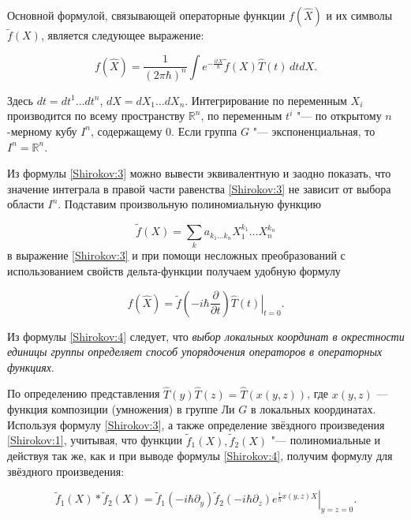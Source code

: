 Основной формулой, связывающей операторные функции $f(\hat X)$ и их символы ${\tilde f}(X)$, является следующее выражение:

\begin{equation}\label{Shirokov:3}

f(\hat X)=\frac{1}{(2\pi\hbar)^n}\int e^{-\frac{itX}{\hbar}}{\tilde f}(X)\hat T(t)\,dt dX.

\end{equation}

Здесь $dt=dt^1\dots dt^n$, $dX=dX_1\dots dX_n$. Интегрирование по переменным $X_i$ производится по всему пространству $\mathbb R^n$, по переменным $t^i$ "--- по открытому $n$-мерному кубу $I^n$, содержащему 0. Если группа $G$ "--- экспоненциальная, то $I^n=\mathbb R^n$.





Из формулы \eqref{Shirokov:3} можно вывести эквивалентную и заодно показать, что значение интеграла в правой части равенства  \eqref{Shirokov:3} не зависит от выбора области $I^n$. Подставим произвольную полиномиальную функцию 

$${\tilde f}(X)=\sum_{k}a_{k_1\dots k_n}X_1^{k_1}\dots X_n^{k_n}$$ в выражение \eqref{Shirokov:3} и при помощи несложных преобразований с использованием свойств дельта-функции получаем удобную формулу

\begin{equation}\label{Shirokov:4}

f({\hat X})={\tilde f}\left(-i\hbar\frac{\partial}{\partial t}\right)\left.\hat T(t)\right|_{t=0}.

\end{equation}



Из формулы \eqref{Shirokov:4} следует, что \emph{выбор локальных координат в окрестности единицы группы определяет способ упорядочения операторов в операторных функциях}.



По определению представления $\hat T(y)\hat T(z)=\hat T(x(y,z))$, где $x(y,z)$ --- функция композиции (умножения) в группе Ли $G$ в локальных координатах. Используя формулу \eqref{Shirokov:3}, а также определение звёздного произведения \eqref{Shirokov:1}, учитывая, что функции ${\tilde f}_1(X),{\tilde f}_2(X)$ "--- полиномиальные и действуя так же, как и при выводе формулы \eqref{Shirokov:4}, получим формулу для звёздного произведения:

\begin{equation}\label{Shirokov:star}

{\tilde f}_1(X)*{\tilde f}_2(X)=\left.{\tilde f}_1(-i\hbar\partial_y){\tilde f}_2(-i\hbar\partial_z)e^{\frac{i}{\hbar}x(y,z)X}\right|_{y=z=0}.

\end{equation}



